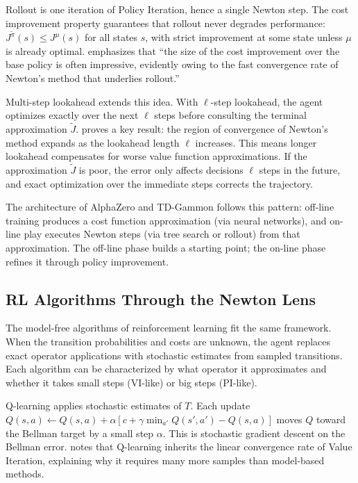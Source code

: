 Rollout is one iteration of Policy Iteration, hence a single Newton step. The cost improvement property guarantees that rollout never degrades performance: $J^{\tilde{\pi}}(s) \leq J^\mu(s)$ for all states $s$, with strict improvement at some state unless $\mu$ is already optimal. \citet{bertsekas2024} emphasizes that ``the size of the cost improvement over the base policy is often impressive, evidently owing to the fast convergence rate of Newton's method that underlies rollout.''

Multi-step lookahead extends this idea. With $\ell$-step lookahead, the agent optimizes exactly over the next $\ell$ steps before consulting the terminal approximation $\tilde{J}$. \citet{bertsekas2024} proves a key result: the region of convergence of Newton's method expands as the lookahead length $\ell$ increases. This means longer lookahead compensates for worse value function approximations. If the approximation $\tilde{J}$ is poor, the error only affects decisions $\ell$ steps in the future, and exact optimization over the immediate steps corrects the trajectory.

The architecture of AlphaZero and TD-Gammon follows this pattern: off-line training produces a cost function approximation (via neural networks), and on-line play executes Newton steps (via tree search or rollout) from that approximation. The off-line phase builds a starting point; the on-line phase refines it through policy improvement.


\subsection{RL Algorithms Through the Newton Lens}
\label{sec:rl_algorithms}

The model-free algorithms of reinforcement learning fit the same framework. When the transition probabilities and costs are unknown, the agent replaces exact operator applications with stochastic estimates from sampled transitions. Each algorithm can be characterized by what operator it approximates and whether it takes small steps (VI-like) or big steps (PI-like).

Q-learning applies stochastic estimates of $T$. Each update $Q(s,a) \leftarrow Q(s,a) + \alpha[c + \gamma \min_{a'} Q(s',a') - Q(s,a)]$ moves $Q$ toward the Bellman target by a small step $\alpha$. This is stochastic gradient descent on the Bellman error. \citet{bertsekas2024} notes that Q-learning inherits the linear convergence rate of Value Iteration, explaining why it requires many more samples than model-based methods.

